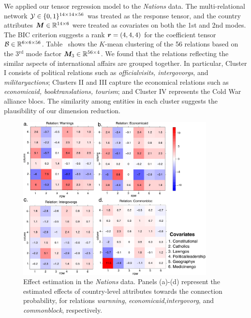 \documentclass[12pt]{article}
\theoremstyle{plain}
\theoremstyle{definition}
\begin{document}
We applied our tensor regression model to the \emph{Nations} data. The multi-relational network $\mathcal{Y}\in\{0,1\}^{14\times 14\times 56}$ was treated as the response tensor, and the country attributes $\bm M\in\mathbb{R}^{14\times 6}$ were treated as covariates on both the 1st and 2nd modes. The BIC criterion suggests a rank $\bm{r}=(4,4,4)$ for the coefficient tensor $\mathcal{B}\in\mathbb{R}^{6\times 6 \times 56}$. Table~ shows the $K$-mean clustering of the 56 relations based on the 3$^\text{rd}$ mode factor $\bm M_3\in\mathbb{R}^{56\times 4}$. We found that the relations reflecting the similar aspects of international affairs are grouped together. In particular, Cluster I consists of political relations such as \emph{officialvisits, intergovorgs}, and \emph{militaryactions}; Clusters II and III capture the economical relations such as \emph{economicaid, booktranslations, tourism}; and Cluster IV represents the Cold War alliance blocs. The similarity among entities in each cluster suggests the plausibility of our dimension reduction. 

\begin{figure}[t]
\centering
\includegraphics[width=10cm]{coef.pdf}
\caption{Effect estimation in the \emph{Nations} data. Panels (a)-(d) represent the estimated effects of country-level attributes towards the connection probability, for relations \emph{warnning}, \emph{economicaid},\emph{intergovorg}, and \emph{commonblock}, respectively. }\label{fig:est}

\end{figure}
\end{document}
